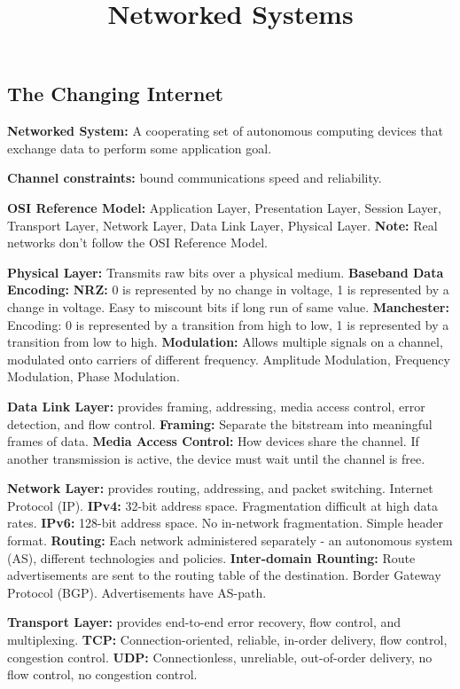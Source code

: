 \documentclass{article}
\title{Networked Systems}
\author{}
\date{}
\begin{document}

\subsection*{The Changing Internet}

\textbf{Networked System:} A cooperating set of autonomous computing devices that exchange data to perform some application goal.

\textbf{Channel constraints:} bound communications speed and reliability.

\textbf{OSI Reference Model:} Application Layer, Presentation Layer, Session Layer, Transport Layer, Network Layer, Data Link Layer, Physical Layer.
\textbf{Note:} Real networks don't follow the OSI Reference Model.

\textbf{Physical Layer:} Transmits raw bits over a physical medium.
\textbf{Baseband Data Encoding:}
\textbf{NRZ:} 0 is represented by no change in voltage, 1 is represented by a change in voltage. Easy to miscount bits if long run of same value.
\textbf{Manchester:} Encoding: 0 is represented by a transition from high to low, 1 is represented by a transition from low to high.
\textbf{Modulation:} Allows multiple signals on a channel, modulated onto carriers of different frequency. Amplitude Modulation, Frequency Modulation, Phase Modulation.

\textbf{Data Link Layer:} provides framing, addressing, media access control, error detection, and flow control.
\textbf{Framing:} Separate the bitstream into meaningful frames of data.
\textbf{Media Access Control:} How devices share the channel. If another transmission is active, the device must wait until the channel is free.


\textbf{Network Layer:} provides routing, addressing, and packet switching. Internet Protocol (IP).
\textbf{IPv4:} 32-bit address space. Fragmentation difficult at high data rates.
\textbf{IPv6:} 128-bit address space. No in-network fragmentation. Simple header format.
\textbf{Routing:} Each network administered separately {-} an autonomous system (AS), different technologies and policies.
\textbf{Inter-domain Rounting:} Route advertisements are sent to the routing table of the destination. Border Gateway Protocol (BGP). Advertisements have AS-path.


\textbf{Transport Layer:} provides end-to-end error recovery, flow control, and multiplexing.
\textbf{TCP:} Connection-oriented, reliable, in-order delivery, flow control, congestion control.
\textbf{UDP:} Connectionless, unreliable, out-of-order delivery, no flow control, no congestion control.
\end{document}
